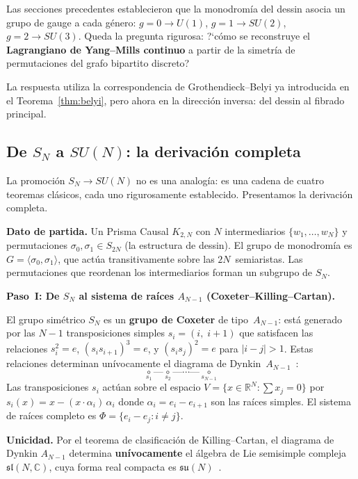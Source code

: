 \documentclass[11pt, a4paper, openany]{book}
\begin{document}
Las secciones precedentes establecieron que la monodrom\'ia del dessin
asocia un grupo de gauge a cada g\'enero:
$g = 0 \to U(1)$, $g = 1 \to SU(2)$, $g = 2 \to SU(3)$.
Queda la pregunta rigurosa: ?`c\'omo se reconstruye el
\textbf{Lagrangiano de Yang--Mills continuo} a partir de la
simetr\'ia de permutaciones del grafo bipartito discreto?

La respuesta utiliza la correspondencia de Grothendieck--Belyi ya
introducida en el Teorema~\ref{thm:belyi}, pero ahora en la
direcci\'on inversa: del dessin al fibrado principal.

\subsection{De $S_N$ a $SU(N)$: la derivaci\'on completa}

La promoci\'on $S_N \to SU(N)$ no es una analog\'ia: es una cadena
de cuatro teoremas cl\'asicos, cada uno rigurosamente establecido.
Presentamos la derivaci\'on completa.

\medskip\noindent
\textbf{Dato de partida.}
Un Prisma Causal $K_{2,N}$ con $N$ intermediarios
$\{w_1, \ldots, w_N\}$ y permutaciones
$\sigma_0, \sigma_1 \in S_{2N}$ (la estructura de dessin). El grupo
de monodrom\'ia es $G = \langle \sigma_0, \sigma_1 \rangle$, que
act\'ua transitivamente sobre las $2N$~semiaristas. Las permutaciones
que reordenan los intermediarios forman un subgrupo de $S_N$.

\medskip\noindent
\textbf{Paso~I: De $S_N$ al sistema de ra\'ices $A_{N-1}$
(Coxeter--Killing--Cartan).}

El grupo sim\'etrico $S_N$ es un \textbf{grupo de Coxeter} de
tipo~$A_{N-1}$: est\'a generado por las $N - 1$ transposiciones
simples $s_i = (i,\; i{+}1)$ que satisfacen las relaciones
$s_i^2 = e$, $(s_i s_{i+1})^3 = e$, y $(s_i s_j)^2 = e$ para
$|i - j| > 1$. Estas relaciones determinan un\'ivocamente el diagrama
de Dynkin~$A_{N-1}$~\cite{humphreys1990}:
\[
  \underset{s_1}{\circ} \text{---}
  \underset{s_2}{\circ} \text{---}
  \cdots \text{---}
  \underset{s_{N-1}}{\circ}
\]
Las transposiciones $s_i$ act\'uan sobre el espacio
$V = \{x \in \mathbb{R}^N : \sum x_j = 0\}$ por
$s_i(x) = x - (x \cdot \alpha_i)\,\alpha_i$ donde
$\alpha_i = e_i - e_{i+1}$ son las ra\'ices simples. El sistema
de ra\'ices completo es $\Phi = \{e_i - e_j : i \neq j\}$.

\smallskip\noindent
\textbf{Unicidad.} Por el teorema de clasificaci\'on de Killing--Cartan,
el diagrama de Dynkin $A_{N-1}$ determina \textbf{un\'ivocamente} el
\'algebra de Lie semisimple compleja $\mathfrak{sl}(N, \mathbb{C})$, cuya
forma real compacta es $\mathfrak{su}(N)$~\cite{humphreys1972}.
\end{document}
